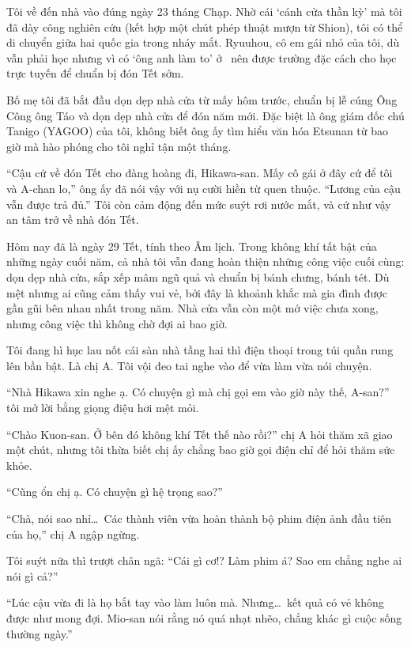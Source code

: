 \documentclass[../main.tex]{subfiles}
\begin{document}
Tôi về đến nhà vào đúng ngày 23 tháng Chạp. Nhờ cái `cánh cửa thần kỳ' mà tôi đã dày công nghiên cứu (kết hợp một chút phép thuật mượn từ Shion), tôi có thể di chuyển giữa hai quốc gia trong nháy mắt. Ryuuhou, cô em gái nhỏ của tôi, dù vẫn phải học nhưng vì có `ông anh làm to' ở \hll\ nên được trường đặc cách cho học trực tuyến để chuẩn bị đón Tết sớm.

Bố mẹ tôi đã bắt đầu dọn dẹp nhà cửa từ mấy hôm trước, chuẩn bị lễ cúng Ông Công ông Táo và dọn dẹp nhà cửa để đón năm mới. Đặc biệt là ông giám đốc chú Tanigo (YAGOO) của tôi, không biết ông ấy tìm hiểu văn hóa Etsunan từ bao giờ mà hào phóng cho tôi nghỉ tận một tháng.

``Cậu cứ về đón Tết cho đàng hoàng đi, Hikawa-san. Mấy cô gái ở đây cứ để tôi và A-chan lo,'' ông ấy đã nói vậy với nụ cười hiền từ quen thuộc. ``Lương của cậu vẫn được trả đủ.'' Tôi còn cảm động đến mức suýt rơi nước mắt, và cứ như vậy an tâm trở về nhà đón Tết.

Hôm nay đã là ngày 29 Tết, tính theo Âm lịch. Trong không khí tất bật của những ngày cuối năm, cả nhà tôi vẫn đang hoàn thiện những công việc cuối cùng: dọn dẹp nhà cửa, sắp xếp mâm ngũ quả và chuẩn bị bánh chưng, bánh tét. Dù mệt nhưng ai cũng cảm thấy vui vẻ, bởi đây là khoảnh khắc mà gia đình được gần gũi bên nhau nhất trong năm. Nhà cửa vẫn còn một mớ việc chưa xong, nhưng công việc thì không chờ đợi ai bao giờ.

Tôi đang hì hục lau nốt cái sàn nhà tầng hai thì điện thoại trong túi quần rung lên bần bật. Là chị A. Tôi vội đeo tai nghe vào để vừa làm vừa nói chuyện.

``Nhà Hikawa xin nghe ạ. Có chuyện gì mà chị gọi em vào giờ này thế, A-san?'' tôi mở lời bằng giọng điệu hơi mệt mỏi.

``Chào Kuon-san. Ở bên đó không khí Tết thế nào rồi?'' chị A hỏi thăm xã giao một chút, nhưng tôi thừa biết chị ấy chẳng bao giờ gọi điện chỉ để hỏi thăm sức khỏe.

``Cũng ổn chị ạ. Có chuyện gì hệ trọng sao?''

``Chà, nói sao nhỉ\dots\ Các thành viên vừa hoàn thành bộ phim điện ảnh đầu tiên của họ,'' chị A ngập ngừng.

Tôi suýt nữa thì trượt chân ngã: ``Cái gì cơ!? Làm phim á? Sao em chẳng nghe ai nói gì cả?''

``Lúc cậu vừa đi là họ bắt tay vào làm luôn mà. Nhưng\dots\ kết quả có vẻ không được như mong đợi. Mio-san nói rằng nó quá nhạt nhẽo, chẳng khác gì cuộc sống thường ngày.''
\end{document}
